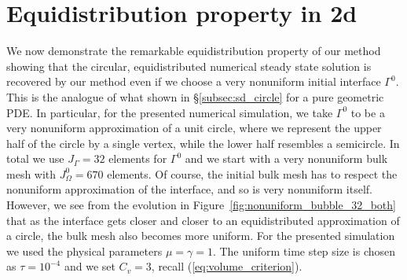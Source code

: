 \section{Equidistribution property in 2d}\label{sec:stokes_2d_equidistributon}
We now demonstrate the remarkable equidistribution property of our method
showing that the circular, equidistributed numerical steady state solution is
recovered by our method even if we choose a very nonuniform initial interface
$\Gamma^0$. This is the analogue of what shown in \S\ref{subsec:sd_circle}
for a pure geometric PDE. In particular, for the presented numerical
simulation, we take $\Gamma^0$ to be a very nonuniform approximation of a unit
circle, where we represent the upper half of the circle by a single vertex,
while the lower half resembles a semicircle. In total we use $J_\Gamma = 32$
elements for $\Gamma^0$ and we start with a very nonuniform bulk mesh with
$J_\Omega^0 = 670$ elements. Of course, the initial bulk mesh has to respect
the nonuniform approximation of the interface, and so is very nonuniform
itself. However, we see from the evolution in
Figure~\ref{fig:nonuniform_bubble_32_both} that as the interface gets closer
and closer to an equidistributed approximation of a circle, the bulk mesh also
becomes more uniform. For the presented simulation we used the physical
parameters $\mu= \gamma=1$. The uniform time step size is chosen as
$\tau=10^{-4}$ and we set $C_v=3$, recall (\ref{eq:volume_criterion}).
